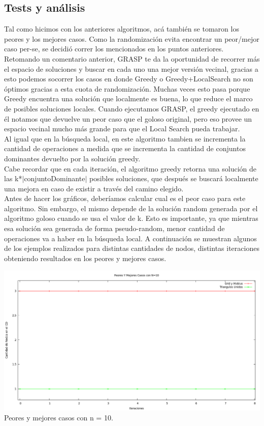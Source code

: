 \subsection{Tests y análisis}
Tal como hicimos con los anteriores algoritmos, acá también se tomaron los peores y los mejores casos. Como la randomización evita encontrar un peor/mejor caso per-se, se 
decidió correr los mencionados
en los puntos anteriores. Retomando un comentario anterior, GRASP te da la oportunidad de recorrer más el espacio de soluciones y buscar en cada uno una mejor versión vecinal, 
gracias a esto podemos socorrer los 
casos en donde Greedy o Greedy+LocalSearch no son óptimos gracias a esta cuota de randomización. Muchas veces esto pasa porque Greedy encuentra una solución que localmente es 
buena, lo que reduce el marco 
de posibles soluciones locales. Cuando ejecutamos GRASP, el greedy ejecutado en él notamos que devuelve un peor caso que el goloso original, pero eso provee un espacio vecinal 
mucho más grande para que el Local
Search pueda trabajar. \\
Al igual que en la búsqueda local, en este algoritmo tambien se incrementa la cantidad de operaciones a medida
que se incrementa la cantidad de conjuntos dominantes devuelto por la solución greedy.\\
Cabe recordar que en cada iteración, el algoritmo greedy retorna una solución de las k*$|$conjuntoDominante$|$ posibles soluciones, que después se buscará localmente una mejora 
en caso de existir a través del camino elegido.\\
Antes de hacer los gráficos, deberíamos calcular cual es el peor caso para este algoritmo. Sin embargo, el mismo depende de la solución random generada por el algoritmo goloso cuando se usa el valor de k. Esto es importante, ya que mientras esa solución sea generada de forma pseudo-random, menor cantidad
de operaciones va a haber en la búsqueda local.
A continuación se muestran algunos de los ejemplos realizados para distintas cantidades de nodos, distintas iteraciones obteniendo resultados en los peores y mejores casos.


\begin{center}
\includegraphics[width=17cm]{./graficos/grasp/peoresymejoresn10NUEVO.png}\\
Peores y mejores casos con n = 10.
\end{center}

